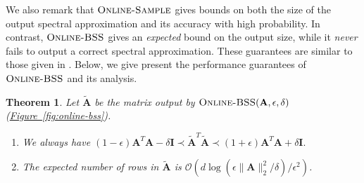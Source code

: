 \documentclass[11pt]{article}
\numberwithin{equation}{section}
\newtheorem{theorem}{Theorem}[section]
\theoremstyle{definition}
\theoremstyle{plain}
\newcommand{\expref}[2]{\hyperref[#2]{#1~\ref{#2}}}
\newcommand{\Oh}{\ensuremath{\mathcal{O}}}
\newcommand{\bv}[1]{\mathbf{#1}}
\newcommand{\norm}[1]{\|#1\|}
\begin{document}
We also remark that $\textsc{Online-Sample}$  gives bounds on both the size of the output spectral approximation and its accuracy with high probability.  In contrast, $\textsc{Online-BSS}$ gives an \emph{expected} bound on the output size, while it \emph{never} fails to output a correct spectral approximation.  These guarantees are similar to those given in  \cite{lee2015linear}.
%
%
%
%
%
Below, we give present the performance  guarantees of $\textsc{Online-BSS}$ and its analysis.

\begin{theorem}
\leavevmode
\label{thm:bss}
 Let  $\bv{\tilde{A}}$ be the matrix output by  $\textsc{Online-BSS}(\bv{A},\epsilon,\delta)$ (\expref{Figure}{fig:online-bss}).
\begin{enumerate}
\item We always have %
$
(1-\epsilon) \bv{A}^T \bv{A} - \delta \bv{I} \prec \bv{\tilde{A}}^T \bv{\tilde{A}} \prec (1+\epsilon) \bv{A}^T \bv{A} + \delta \bv{I}.
$

\item
The expected number of rows in $\bv{\tilde{A}}$ is $\Oh(d \log (\epsilon\norm{\bv A}_2^2/\delta) / \epsilon^2)$.
\end{enumerate}
\end{theorem}
\end{document}
